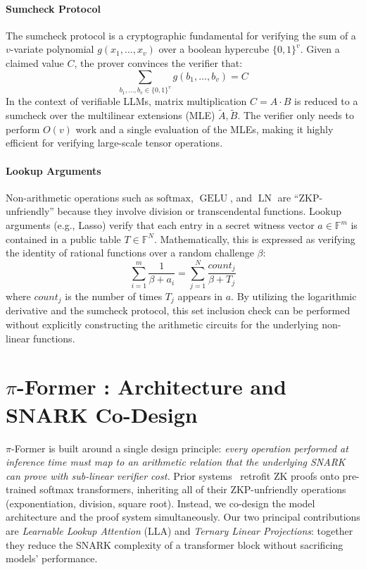 \documentclass{article}
\newcommand{\FF}{\mathbb{F}}          %
\newcommand{\softmax}{\mathrm{softmax}}
\newcommand{\sys}{{$\pi$-Former }}
\DeclareMathOperator{\LN}{LN}
\DeclareMathOperator{\GELU}{GELU}
\begin{document}
\paragraph{Sumcheck Protocol}
The sumcheck protocol is a cryptographic fundamental for verifying the sum of a $v$-variate polynomial $g(x_1, \dots, x_v)$ over a boolean hypercube $\{0,1\}^v$. Given a claimed value $C$, the prover convinces the verifier that:
\begin{equation}
    \sum_{b_1, \dots, b_v \in \{0,1\}^v} g(b_1, \dots, b_v) = C
\end{equation}
In the context of verifiable LLMs, matrix multiplication $C = A \cdot B$ is reduced to a sumcheck over the multilinear extensions (MLE) $\tilde{A}, \tilde{B}$. The verifier only needs to perform $O(v)$ work and a single evaluation of the MLEs, making it highly efficient for verifying large-scale tensor operations.

\paragraph{Lookup Arguments}
Non-arithmetic operations such as $\softmax$, $\GELU$, and $\LN$ are ``ZKP-unfriendly'' because they involve division or transcendental functions. Lookup arguments (e.g., Lasso) verify that each entry in a secret witness vector $a \in \FF^m$ is contained in a public table $T \in \FF^N$. Mathematically, this is expressed as verifying the identity of rational functions over a random challenge $\beta$:
\begin{equation}
    \sum_{i=1}^m \frac{1}{\beta + a_i} = \sum_{j=1}^N \frac{count_j}{\beta + T_j}
\end{equation}
where $count_j$ is the number of times $T_j$ appears in $a$. By utilizing the logarithmic derivative and the sumcheck protocol, this set inclusion check can be performed without explicitly constructing the arithmetic circuits for the underlying non-linear functions.

\section{\sys: Architecture and SNARK Co-Design}
\label{sec:method}

\sys is built around a single design principle: \emph{every operation
performed at inference time must map to an arithmetic relation that the
underlying SNARK can prove with sub-linear verifier cost.}  Prior
systems~\cite{sun2024zkllm,qu2025zkgpt} retrofit ZK proofs onto
pre-trained softmax transformers, inheriting all of their
ZKP-unfriendly operations (exponentiation, division, square root).
Instead, we co-design the model architecture and the proof system
simultaneously.  Our two principal contributions are
\emph{Learnable Lookup Attention} (LLA) and \emph{Ternary Linear Projections}: together they reduce the SNARK complexity of a transformer
block without sacrificing models' performance.
\end{document}
